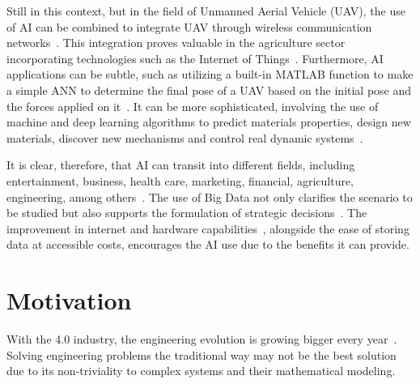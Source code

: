 Still in this context, but in the field of Unmanned Aerial Vehicle (UAV), the use of AI can be combined to integrate UAV through wireless communication networks~\cite{lahmeri2021}. This integration proves valuable in the agriculture sector~\cite{ahirwar2019} incorporating technologies such as the Internet of Things~\cite{verdouw2016,tzounis2017}.
Furthermore, AI applications can be subtle, such as utilizing a built-in MATLAB function to make a simple ANN to determine the final pose of a UAV based on the initial pose and the forces applied on it~\cite{geronel2023}. It can be more sophisticated, involving the use of machine and deep learning algorithms to predict materials properties, design new materials, discover new mechanisms and control real dynamic systems~\cite{guo2021,assilian1974}.

It is clear, therefore, that AI can transit into different fields, including entertainment, business, health care, marketing, financial, agriculture, engineering, among others~\cite{ruiz-real2020,yu2018,davenport2019,verma2021,mhlanga2020,pannu2015,ghatrehsamani2023}. 
The use of Big Data not only clarifies the scenario to be studied but also supports the formulation of strategic decisions~\cite{jeble2018,koscielniak2015}.
The improvement in internet and hardware capabilities~\cite{baji2018}, alongside the ease of storing data at accessible costs, encourages the AI use due to the benefits it can provide.

\section{Motivation}

With the 4.0 industry, the engineering evolution is growing bigger every year~\cite{meindl2021}.
Solving engineering problems the traditional way may not be the best solution due to its non-triviality to complex systems and their mathematical modeling.


